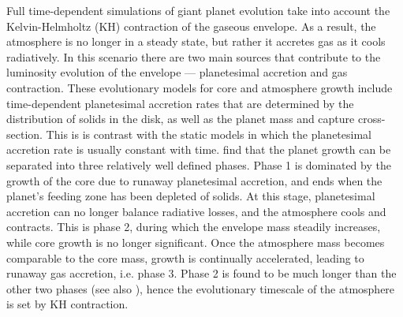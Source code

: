 \documentclass[apj, numberedappendix]{emulateapj}
\begin{document}


Full time-dependent simulations of giant planet evolution take into account the Kelvin-Helmholtz (KH) contraction of the gaseous envelope. As a result, the atmosphere is no longer in a steady state, but rather it accretes gas as it cools radiatively. In this scenario there are two main sources that contribute to the luminosity evolution of the envelope --- planetesimal accretion and gas contraction. These evolutionary models for core and atmosphere growth include time-dependent planetesimal accretion rates that are determined by the distribution of solids in the disk, as well as the planet mass and capture cross-section. This is is contrast with the static models in which the planetesimal accretion rate is usually constant with time. \citet{pollack96} find that the planet growth can be separated into three relatively well defined phases. Phase 1 is dominated by the growth of the core due to runaway planetesimal accretion, and ends when the planet's feeding zone has been depleted of solids. At this stage, planetesimal accretion can no longer balance radiative losses, and the atmosphere cools and contracts. This is phase 2, during which the envelope mass steadily increases, while core growth is no longer significant. Once the atmosphere mass becomes comparable to the core mass, growth is continually accelerated, leading to runaway gas accretion, i.e. phase 3. Phase 2 is found to be much longer than the other two phases (see also \citealt{alibert05}), hence the evolutionary timescale of the atmosphere is set by KH contraction.
\end{document}
